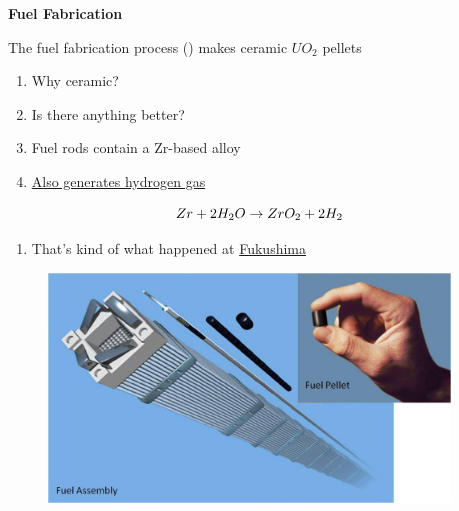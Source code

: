 \documentclass[aspectratio=1610,pdftex,dvipsnames,compress,xcolor={dvipsnames}]{beamer}
\newcommand{\acsp}{\acrshortpl} %
\begin{document}
\begin{frame}[plain]{}
    \centering\LARGE\textbf{Fuel Fabrication}
\end{frame}


\addtocounter{framenumber}{-1} 
\begin{frame}{The fuel fabrication process (\acsp{lwr}) makes ceramic $UO_2$ pellets}
    \begin{enumerate}[series=outerlist,topsep=0pt,itemsep=21pt,leftmargin=*,label=(\arabic*)]
        \item[]Why ceramic?
        \item[]Is there anything better?
        \item[]Fuel rods contain a Zr-based alloy
        \item[]\href{https://inis.iaea.org/collection/NCLCollectionStore/_Public/47/032/47032411.pdf}{Also generates hydrogen gas}
    \end{enumerate}

    \vspace*{\fill}

    \begin{equation}
        \LARGE 
        Zr+2H_2O \rightarrow ZrO_2+2H_2
    \end{equation}
    
    \vspace*{\fill}

    \begin{enumerate}[series=outerlist,topsep=0pt,itemsep=21pt,leftmargin=*,label=(\arabic*)]
        \item[]That's kind of what happened at \href{https://www.nature.com/news/2011/110322/full/471417a.html}{Fukushima}
    \end{enumerate}
\end{frame}


\begin{frame}{}
    \begin{figure}
        \centering
        \includegraphics[width=0.95\textwidth]{pellet.jpg}
    \end{figure}
\end{frame}
\end{document}

